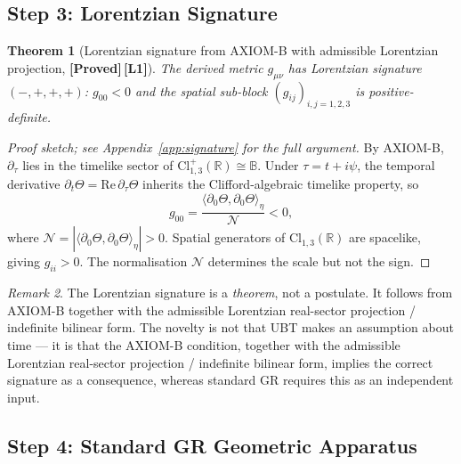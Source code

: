 \documentclass[12pt,a4paper]{article}
\newtheorem{theorem}{Theorem}[section]
\theoremstyle{definition}
\theoremstyle{remark}
\newtheorem{remark}[theorem]{Remark}
\newcommand{\PROVED}{\textbf{[Proved]}}
\newcommand{\Lone}{\textbf{[L1]}}
\newcommand{\BB}{\mathbb{B}}
\newcommand{\RR}{\mathbb{R}}
\newcommand{\re}{\mathrm{Re}}
\newcommand{\calN}{\mathcal{N}}
\begin{document}
\subsection{Step 3: Lorentzian Signature}
\label{sec:step3}

\begin{theorem}[Lorentzian signature from AXIOM-B with admissible Lorentzian projection, \PROVED\,\Lone]
\label{thm:signature}
The derived metric $g_{\mu\nu}$ has Lorentzian signature $(-,+,+,+)$:
$g_{00} < 0$ and the spatial sub-block $(g_{ij})_{i,j=1,2,3}$ is
positive-definite.
\end{theorem}

\begin{proof}[Proof sketch; see Appendix~\ref{app:signature} for the full argument]
By AXIOM-B, $\partial_\tau$ lies in the timelike sector of
$\mathrm{Cl}^+_{1,3}(\RR) \cong \BB$.
Under $\tau = t + i\psi$, the temporal derivative
$\partial_t\Theta = \re\,\partial_\tau\Theta$
inherits the Clifford-algebraic timelike property, so
\[
  g_{00}
  = \frac{\langle \partial_0\Theta,\partial_0\Theta \rangle_\eta}{\calN} < 0,
\]
where $\calN = |\langle \partial_0\Theta,\partial_0\Theta \rangle_\eta| > 0$.
Spatial generators of $\mathrm{Cl}_{1,3}(\RR)$ are spacelike, giving $g_{ii} > 0$.
The normalisation $\calN$ determines the scale but not the sign.
\end{proof}

\begin{remark}
The Lorentzian signature is a \emph{theorem}, not a postulate.
It follows from AXIOM-B together with the admissible Lorentzian real-sector projection / indefinite bilinear form.
The novelty is not that UBT makes an assumption about time --- it is that the AXIOM-B condition, together with the admissible Lorentzian real-sector projection / indefinite bilinear form, implies the correct signature as a consequence, whereas standard
GR requires this as an independent input.
\end{remark}

\subsection{Step 4: Standard GR Geometric Apparatus}
\label{sec:step4}
\end{document}
